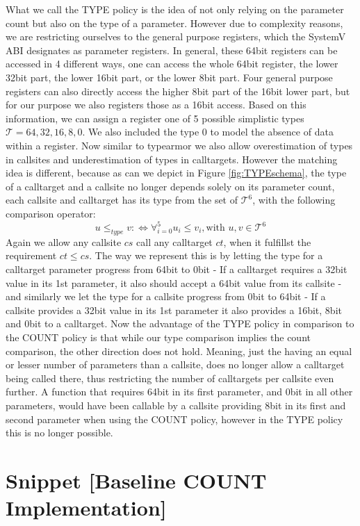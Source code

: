 What we call the TYPE policy is the idea of not only relying on the parameter count but also on the type of a parameter. However due to complexity reasons, we are restricting ourselves to the general purpose registers, which the SystemV ABI designates as parameter registers. In general, these 64bit registers can be accessed in 4 different ways, one can access the whole 64bit register, the lower 32bit part, the lower 16bit part, or the lower 8bit part. Four general purpose registers can also directly access the higher 8bit part of the 16bit lower part, but for our purpose we also registers those as a 16bit access. Based on this information, we can assign a register one of 5 possible simplistic types $\mathcal{T} = {64, 32, 16, 8, 0}$. We also included the type 0 to model the absence of data within a register. Now similar to typearmor we also allow overestimation of types in callsites and underestimation of types in calltargets. However the matching idea is different, because as can we depict in Figure \ref{fig:TYPEschema}, the type of a calltarget and a callsite no longer depends solely on its parameter count, each callsite and calltarget has its type from the set of $\mathcal{T}^6$, with the following comparison operator:
\[
	u \leq_{type} v :\Longleftrightarrow  \forall_{i = 0}^{5} {u_i \leq v_i} , \text {with } u, v \in \mathcal{T}^6
\]
Again we allow any callsite $cs$ call any calltarget $ct$, when it fulfillst the requirement $ct \leq cs$. The way we represent this is by letting the type for a calltarget parameter progress from 64bit to 0bit - If a calltarget requires a 32bit value in its 1st parameter, it also should accept a 64bit value from its callsite - and similarly we let the type for a callsite progress from 0bit to 64bit - If a callsite provides a 32bit value in its 1st parameter it also provides a 16bit, 8bit and 0bit to a calltarget. Now the advantage of the TYPE policy in comparison to the COUNT policy is that while our type comparison implies the count comparison, the other direction does not hold. Meaning, just the having an equal or lesser number of parameters than a callsite, does no longer allow a calltarget being called there, thus restricting the number of calltargets per callsite even further. A function that requires 64bit in its first parameter, and 0bit in all other parameters, would have been callable by a callsite providing 8bit in its first and second parameter when using the COUNT policy, however in the TYPE policy this is no longer possible.


\chapter{Snippet [Baseline COUNT Implementation]}

